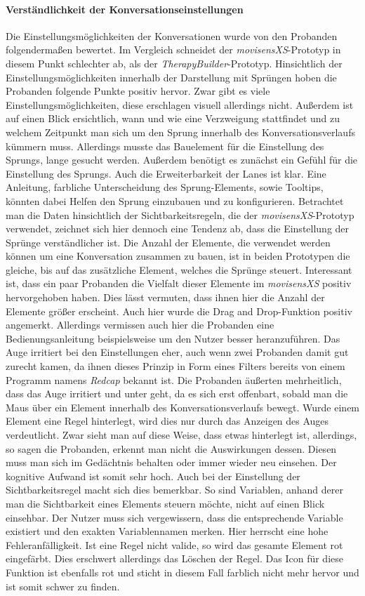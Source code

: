 \paragraph{Verständlichkeit der Konversationseinstellungen}
Die Einstellungsmöglichkeiten der Konversationen wurde von den Probanden folgendermaßen bewertet. Im Vergleich schneidet der \emph{movisensXS}-Prototyp in diesem Punkt schlechter ab, als der \emph{TherapyBuilder}-Prototyp. Hinsichtlich der Einstellungsmöglichkeiten innerhalb der Darstellung mit Sprüngen hoben die Probanden folgende Punkte positiv hervor. Zwar gibt es viele Einstellungsmöglichkeiten, diese erschlagen visuell allerdings nicht. Außerdem ist auf einen Blick ersichtlich, wann und wie eine Verzweigung stattfindet und zu welchem Zeitpunkt man sich um den Sprung innerhalb des Konversationsverlaufs kümmern muss. Allerdings musste das Bauelement für die Einstellung des Sprungs, lange gesucht werden. Außerdem benötigt es zunächst ein Gefühl für die Einstellung des Sprungs. Auch die Erweiterbarkeit der Lanes ist klar. Eine Anleitung, farbliche Unterscheidung des Sprung-Elements, sowie Tooltips, könnten dabei Helfen den Sprung einzubauen und zu konfigurieren. Betrachtet man die Daten hinsichtlich der Sichtbarkeitsregeln, die der \emph{movisensXS}-Prototyp verwendet, zeichnet sich hier dennoch eine Tendenz ab, dass die Einstellung der Sprünge verständlicher ist. Die Anzahl der Elemente, die verwendet werden können um eine Konversation zusammen zu bauen, ist in beiden Prototypen die gleiche, bis auf das zusätzliche Element, welches die Sprünge steuert. Interessant ist, dass ein paar Probanden die Vielfalt dieser Elemente im \emph{movisensXS} positiv hervorgehoben haben. Dies lässt vermuten, dass ihnen hier die Anzahl der Elemente größer erscheint. Auch hier wurde die Drag and Drop-Funktion positiv angemerkt. Allerdings vermissen auch hier die Probanden eine Bedienungsanleitung beispielsweise um den Nutzer besser heranzuführen. Das Auge irritiert bei den Einstellungen eher, auch wenn zwei Probanden damit gut zurecht kamen, da ihnen dieses Prinzip in Form eines Filters bereits von einem Programm namens \emph{Redcap} bekannt ist. Die Probanden äußerten mehrheitlich, dass das Auge irritiert und unter geht, da es sich erst offenbart, sobald man die Maus über ein Element innerhalb des Konversationsverlaufs bewegt. Wurde einem Element eine Regel hinterlegt, wird dies nur durch das Anzeigen des Auges verdeutlicht. Zwar sieht man auf diese Weise, dass etwas hinterlegt ist, allerdings, so sagen die Probanden, erkennt man nicht die Auswirkungen dessen. Diesen muss man sich im Gedächtnis behalten oder immer wieder neu einsehen. Der kognitive Aufwand ist somit sehr hoch. Auch bei der Einstellung der Sichtbarkeitsregel macht sich dies bemerkbar. So sind Variablen, anhand derer man die Sichtbarkeit eines Elements steuern möchte, nicht auf einen Blick einsehbar. Der Nutzer muss sich vergewissern, dass die entsprechende Variable existiert und den exakten Variablennamen merken. Hier herrscht eine hohe Fehleranfälligkeit. Ist eine Regel nicht valide, so wird das gesamte Element rot eingefärbt. Dies erschwert allerdings das Löschen der Regel. Das Icon für diese Funktion ist ebenfalls rot und sticht in diesem Fall farblich nicht mehr hervor und ist somit schwer zu finden.

